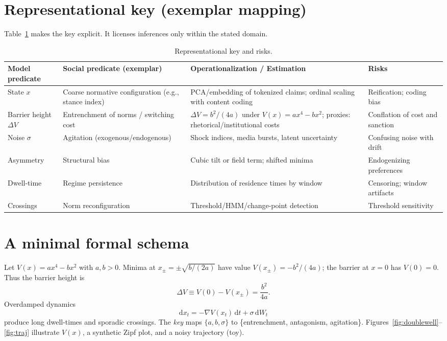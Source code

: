 \documentclass[sn-basic,referee,pdflatex]{sn-jnl}
\begin{document}
\section{Representational key (exemplar mapping)}\label{sec:key}
Table~\ref{tab:key} makes the key explicit. It licenses inferences only within the stated domain.

\begin{table}[t]
\centering
\caption{Representational key and risks.}
\label{tab:key}
\begin{tabular}{@{}p{3.2cm}p{5.2cm}p{5.2cm}p{3.2cm}@{}}
\toprule
\textbf{Model predicate} & \textbf{Social predicate (exemplar)} & \textbf{Operationalization / Estimation} & \textbf{Risks} \\
\midrule
State \(x\) & Coarse normative configuration (e.g., stance index) & PCA/embedding of tokenized claims; ordinal scaling with content coding & Reification; coding bias \\
Barrier height \(\Delta V\) & Entrenchment of norms / switching cost & \(\Delta V = b^2/(4a)\) under \(V(x)=ax^4-bx^2\); proxies: rhetorical/institutional costs & Conflation of cost and sanction \\
Noise \(\sigma\) & Agitation (exogenous/endogenous) & Shock indices, media bursts, latent uncertainty & Confusing noise with drift \\
Asymmetry & Structural bias & Cubic tilt or field term; shifted minima & Endogenizing preferences \\
Dwell-time & Regime persistence & Distribution of residence times by window & Censoring; window artifacts \\
Crossings & Norm reconfiguration & Threshold/HMM/change-point detection & Threshold sensitivity \\
\bottomrule
\end{tabular}
\end{table}

\section{A minimal formal schema}\label{sec:toy}
Let \(V(x)=a x^{4}-b x^{2}\) with \(a,b>0\). Minima at \(x_{\pm}=\pm\sqrt{b/(2a)}\) have value \(V(x_{\pm})=-b^{2}/(4a)\); the barrier at \(x=0\) has \(V(0)=0\). Thus the barrier height is
\begin{equation}
\Delta V \equiv V(0)-V(x_{\pm})=\frac{b^{2}}{4a}.
\end{equation}
Overdamped dynamics
\begin{equation}
\mathrm{d}x_{t}=-\nabla V(x_{t})\,\mathrm{d}t+\sigma\,\mathrm{d}W_{t}
\end{equation}
produce long dwell-times and sporadic crossings. The \emph{key} maps \(\{a,b,\sigma\}\) to \{entrenchment, antagonism, agitation\}. Figures~\ref{fig:doublewell}--\ref{fig:traj} illustrate \(V(x)\), a synthetic Zipf plot, and a noisy trajectory (toy).
\end{document}
